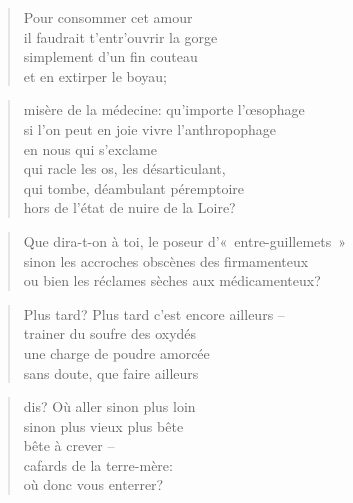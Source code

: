   \begin{verse}
    Pour consommer cet amour\\
    il faudrait t’entr’ouvrir la gorge\\
    simplement d’un fin couteau\\
    et en extirper  le boyau;
  \end{verse}
  \begin{verse}
  \end{verse}
  \begin{verse}
    misère de la médecine: qu’importe l’œsophage\\
    si l’on peut en joie vivre l’anthropophage\\
    en nous qui s’exclame\\
    qui racle les os, les désarticulant,\\
    qui tombe, déambulant péremptoire\\
    hors de l’état de nuire de la Loire?
  \end{verse}
  \begin{verse}
    Que dira-t-on à toi, le poseur d’«~entre-guillemets~»\\
    sinon les accroches obscènes des firmamenteux\\
    ou bien les réclames sèches aux médicamenteux?
  \end{verse}
  \begin{verse}
    Plus tard? Plus tard c’est encore ailleurs --\\
    trainer du soufre des oxydés\\
    une charge de poudre amorcée\\
    sans doute, que faire ailleurs
  \end{verse}
  \begin{verse}
    dis? Où aller sinon plus loin\\
    sinon plus vieux plus bête\\
    bête à crever --\\
    cafards de la terre-mère:\\
    où donc vous enterrer?
  \end{verse}

